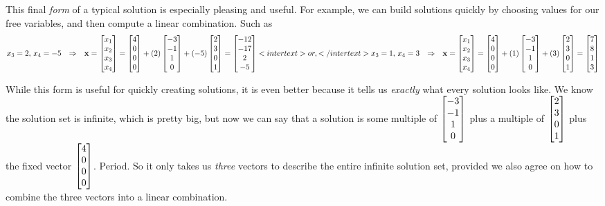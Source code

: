 \documentclass{ximera}
\begin{document}
\begin{example}
  This final \textit{form} of a typical solution is especially
  pleasing and useful.  For example, we can build solutions quickly by
  choosing values for our free variables, and then compute a linear
  combination.  Such as
  \begin{align*}
    x_3=2,\,x_4=-5&&\Rightarrow&&
                                  \mathbf{x}=\begin{bmatrix}x_1\\x_2\\x_3\\x_4\end{bmatrix}=
    \begin{bmatrix}4\\0\\0\\0\end{bmatrix}+(2)\begin{bmatrix}-3\\-1\\1\\0\end{bmatrix}+(-5)\begin{bmatrix}2\\3\\0\\1\end{bmatrix}
    =\begin{bmatrix}-12\\-17\\2\\-5\end{bmatrix}
    <intertext>or,</intertext>
    x_3=1,\,x_4=3&&\Rightarrow&&
                                 \mathbf{x}=\begin{bmatrix}x_1\\x_2\\x_3\\x_4\end{bmatrix}=
    \begin{bmatrix}4\\0\\0\\0\end{bmatrix}+(1)\begin{bmatrix}-3\\-1\\1\\0\end{bmatrix}+(3)\begin{bmatrix}2\\3\\0\\1\end{bmatrix}
    =\begin{bmatrix}7\\8\\1\\3\end{bmatrix}
  \end{align*}
  
  While this form is useful for quickly creating solutions, it is even
  better because it tells us \textit{exactly} what every solution
  looks like.  We know the solution set is infinite, which is pretty
  big, but now we can say that a solution is some multiple of
  $\begin{bmatrix}-3\\-1\\1\\0\end{bmatrix}$ plus a multiple of
  $\begin{bmatrix}2\\3\\0\\1\end{bmatrix}$ plus the fixed vector
  $\begin{bmatrix}4\\0\\0\\0\end{bmatrix}$.  Period.  So it only takes us
  \textit{three} vectors to describe the entire infinite solution set,
  provided we also agree on how to combine the three vectors into a
  linear combination.
\end{example}
\end{document}
